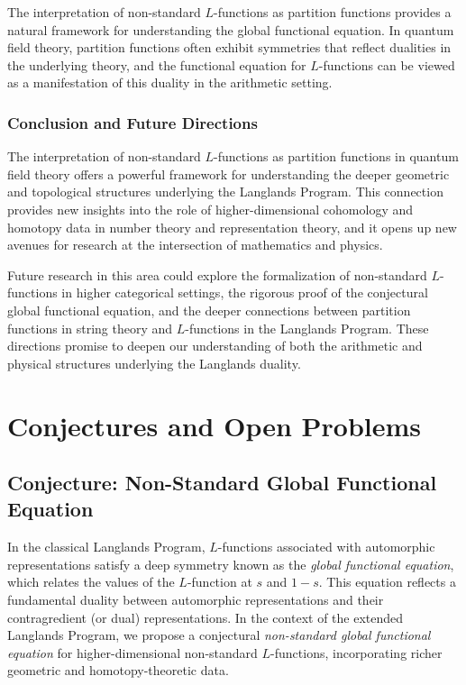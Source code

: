 \documentclass{article}
\theoremstyle{remark}
\begin{document}
The interpretation of non-standard $L$-functions as partition functions provides a natural framework for understanding the global functional equation. In quantum field theory, partition functions often exhibit symmetries that reflect dualities in the underlying theory, and the functional equation for $L$-functions can be viewed as a manifestation of this duality in the arithmetic setting.

\subsubsection{Conclusion and Future Directions}

The interpretation of non-standard $L$-functions as partition functions in quantum field theory offers a powerful framework for understanding the deeper geometric and topological structures underlying the Langlands Program. This connection provides new insights into the role of higher-dimensional cohomology and homotopy data in number theory and representation theory, and it opens up new avenues for research at the intersection of mathematics and physics.

Future research in this area could explore the formalization of non-standard $L$-functions in higher categorical settings, the rigorous proof of the conjectural global functional equation, and the deeper connections between partition functions in string theory and $L$-functions in the Langlands Program. These directions promise to deepen our understanding of both the arithmetic and physical structures underlying the Langlands duality.

\section{Conjectures and Open Problems}

\subsection{Conjecture: Non-Standard Global Functional Equation}

In the classical Langlands Program, $L$-functions associated with automorphic representations satisfy a deep symmetry known as the \emph{global functional equation}, which relates the values of the $L$-function at $s$ and $1-s$. This equation reflects a fundamental duality between automorphic representations and their contragredient (or dual) representations. In the context of the extended Langlands Program, we propose a conjectural \emph{non-standard global functional equation} for higher-dimensional non-standard $L$-functions, incorporating richer geometric and homotopy-theoretic data.
\end{document}
